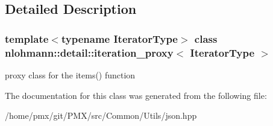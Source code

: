 \subsection{Detailed Description}
\subsubsection*{template$<$typename Iterator\+Type$>$\newline
class nlohmann\+::detail\+::iteration\+\_\+proxy$<$ Iterator\+Type $>$}

proxy class for the items() function 

The documentation for this class was generated from the following file\+:\begin{DoxyCompactItemize}
\item 
/home/pmx/git/\+P\+M\+X/src/\+Common/\+Utils/json.\+hpp\end{DoxyCompactItemize}
